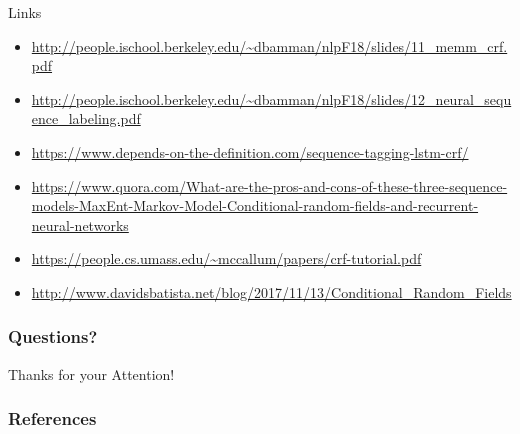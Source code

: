 \documentclass[handout]{beamer}
\begin{document}
\begin{frame}{Links}
\begin{scriptsize}
\begin{itemize}

\item \url{http://people.ischool.berkeley.edu/~dbamman/nlpF18/slides/11_memm_crf.pdf}

\item \url{http://people.ischool.berkeley.edu/~dbamman/nlpF18/slides/12_neural_sequence_labeling.pdf}

\item \url{https://www.depends-on-the-definition.com/sequence-tagging-lstm-crf/}

\item \url{https://www.quora.com/What-are-the-pros-and-cons-of-these-three-sequence-models-MaxEnt-Markov-Model-Conditional-random-fields-and-recurrent-neural-networks}

\item \url{https://people.cs.umass.edu/~mccallum/papers/crf-tutorial.pdf}

\item \url{http://www.davidsbatista.net/blog/2017/11/13/Conditional_Random_Fields} 

\end{itemize}


\end{scriptsize}
\end{frame}






\begin{frame}
\frametitle{Questions?}
\begin{center}\LARGE Thanks for your Attention!\\ \end{center}



\end{frame}

\begin{frame}[allowframebreaks]\scriptsize
\frametitle{References}


%
\end{frame}  


\end{document}

